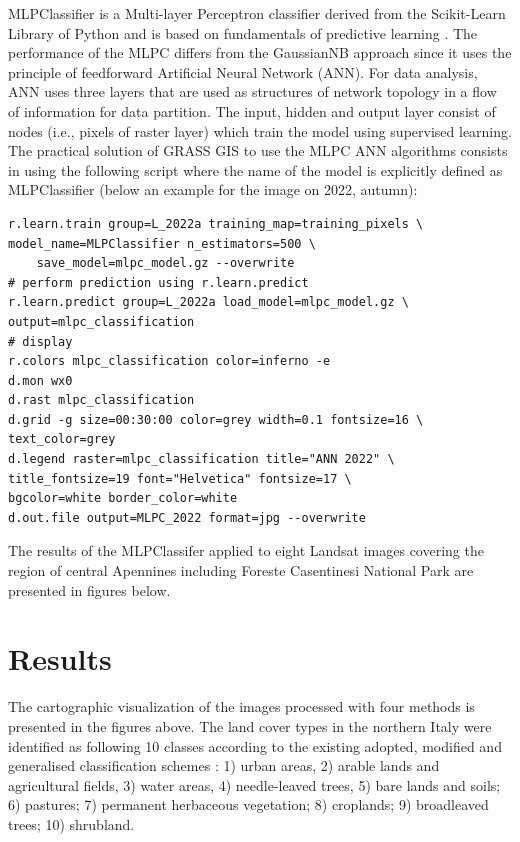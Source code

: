 \documentclass[eprint,
approc,		%
]{actapoly}
\begin{document}
MLPClassifier is a Multi-layer Perceptron classifier derived from the Scikit-Learn Library of Python and is based on fundamentals of predictive learning \citep{Rosenblatt}. The performance of the MLPC differs from the GaussianNB approach since it uses the principle of feedforward Artificial Neural Network (ANN). For data analysis, ANN uses three layers that are used as structures of network topology in a flow of information for data partition. The input, hidden and output layer consist of nodes (i.e., pixels of raster layer) which train the model using supervised learning. The practical solution of GRASS GIS to use the MLPC ANN algorithms consists in using the following script where the name of the model is explicitly defined as MLPClassifier (below an example for the image on 2022, autumn): 

\begin{footnotesize}
\begin{verbatim}
r.learn.train group=L_2022a training_map=training_pixels \
model_name=MLPClassifier n_estimators=500 \
    save_model=mlpc_model.gz --overwrite
# perform prediction using r.learn.predict
r.learn.predict group=L_2022a load_model=mlpc_model.gz \
output=mlpc_classification
# display
r.colors mlpc_classification color=inferno -e
d.mon wx0
d.rast mlpc_classification
d.grid -g size=00:30:00 color=grey width=0.1 fontsize=16 \
text_color=grey
d.legend raster=mlpc_classification title="ANN 2022" \
title_fontsize=19 font="Helvetica" fontsize=17 \
bgcolor=white border_color=white
d.out.file output=MLPC_2022 format=jpg --overwrite
\end{verbatim}
\end{footnotesize}

The results of the MLPClassifer applied to eight Landsat images covering the region of central Apennines including Foreste Casentinesi National Park are presented in figures below.

\section{Results}

The cartographic visualization of the images processed with four methods is presented in the figures above. The land cover types in the northern Italy were identified as following 10 classes according to the existing adopted, modified and generalised classification schemes \citep{DeFioravante}: 1) urban areas, 2) arable lands and agricultural fields, 3) water areas, 4) needle-leaved trees, 5) bare lands and soils; 6) pastures; 7) permanent herbaceous vegetation; 8) croplands; 9) broadleaved trees; 10) shrubland. 
\end{document}
